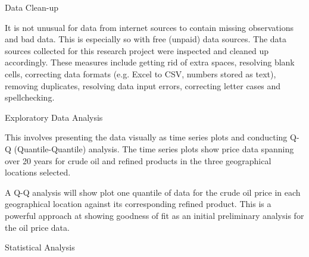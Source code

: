 \documentclass[12pt,twoside]{article}
\begin{document}
\begin{justify}
{\fontsize{11pt}{13.2pt}\selectfont Data Clean-up\par}
\end{justify}\par

\begin{justify}
{\fontsize{11pt}{13.2pt}\selectfont It is not unusual for data from internet sources to contain missing observations and bad data. This is especially so with free (unpaid) data sources. The data sources collected for this research project were inspected and cleaned up accordingly. These measures include getting rid of extra spaces, resolving blank cells, correcting data formats (e.g. Excel to CSV, numbers stored as text), removing duplicates, resolving data input errors, correcting letter cases and spellchecking.\par}
\end{justify}\par

\begin{justify}
{\fontsize{11pt}{13.2pt}\selectfont Exploratory Data Analysis\par}
\end{justify}\par

\begin{justify}
{\fontsize{11pt}{13.2pt}\selectfont This involves presenting the data visually as time series plots and conducting Q-Q (Quantile-Quantile) analysis. The time series plots show price data spanning over 20 years for crude oil and refined products in the three geographical locations selected.\par}
\end{justify}\par

\begin{justify}
{\fontsize{11pt}{13.2pt}\selectfont A Q-Q analysis will show plot one quantile of data for the crude oil price in each geographical location against its corresponding refined product. This is a powerful approach at showing goodness of fit as an initial preliminary analysis for the oil price data.\par}
\end{justify}\par

\begin{justify}
{\fontsize{11pt}{13.2pt}\selectfont Statistical Analysis\par}
\end{justify}\par
\end{document}

